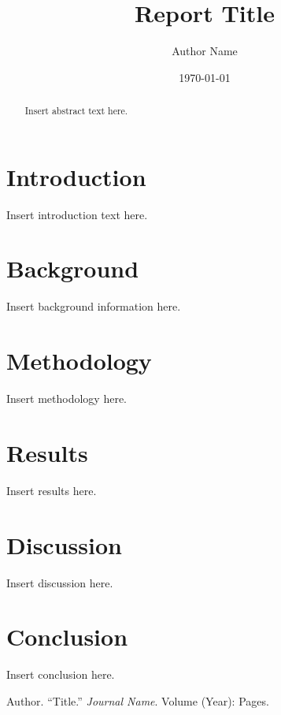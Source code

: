 \documentclass[12pt]{article}
\title{Report Title}
\author{Author Name}
\date{\today}
\begin{document}
\maketitle

\tableofcontents

\begin{abstract}
Insert abstract text here.
\end{abstract}

\section{Introduction}
Insert introduction text here.

\section{Background}
Insert background information here.

\section{Methodology}
Insert methodology here.

\section{Results}
Insert results here.

\section{Discussion}
Insert discussion here.

\section{Conclusion}
Insert conclusion here.

\begin{thebibliography}{9}
Author. ``Title.'' \emph{Journal Name}. Volume (Year): Pages.
\end{thebibliography}
\end{document}
